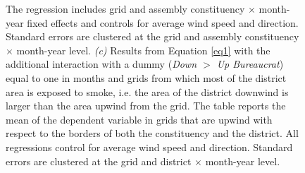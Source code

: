 \documentclass[12pt]{article}
\begin{document}
\begin{figure}
\begin{minipage}{\textwidth}
{          The regression includes grid and assembly constituency $\times$ month-year fixed effects and controls for average wind speed and direction. Standard errors are clustered at the grid and assembly constituency $\times$ month-year level.
          \textit{(c)} Results from Equation \ref{eq1} with the additional interaction with a dummy (\textit{Down $>$ Up Bureaucrat}) equal to one in months and grids from which most of the district area is exposed to smoke, i.e. the area of the district downwind is larger than the area upwind from the grid.
      The table reports the mean of the dependent variable in grids that are upwind with respect to the borders of both the constituency and the district.   All regressions control for average wind speed and direction. Standard errors are clustered at the grid and district $\times$ month-year level. }
     \end{minipage}
\end{figure}
\end{document}
